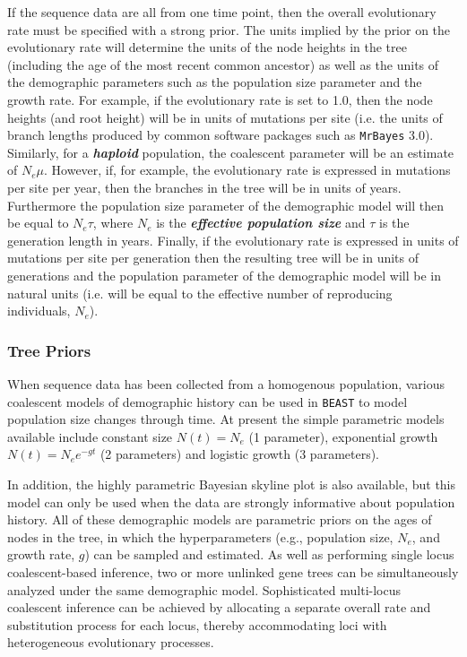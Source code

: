 \documentclass[cup7b, english]{cupbook}
\begin{document}
If the sequence data are all from one time point, then the overall
evolutionary rate must be specified with a strong prior. The units
implied by the prior on the evolutionary rate will determine the units
of the node heights in the tree (including the age of the most recent
common ancestor) as well as the units of the demographic parameters
such as the population size parameter and the growth rate. For example,
if the evolutionary rate is set to 1.0, then the node heights (and
root height) will be in units of mutations per site (i.e. the units
of branch lengths produced by common software packages such as \texttt{MrBayes}
3.0). Similarly, for a \textbf{\textit{haploid}} population, the coalescent parameter
will be an estimate of $N_{e}\mu$. However, if, for example, the
evolutionary rate is expressed in mutations per site per year, then
the branches in the tree will be in units of years. Furthermore the
population size parameter of the demographic model will then be equal
to $N_{e}\tau$, where $N_{e}$ is the \textbf{\textit{effective population size}} and
$\tau$ is the generation length in years. Finally, if the evolutionary
rate is expressed in units of mutations per site per generation then
the resulting tree will be in units of generations and the population
parameter of the demographic model will be in natural units (i.e.
will be equal to the effective number of reproducing individuals,
$N_{e}$).

\subsubsection{Tree Priors}

When sequence data has been collected from a homogenous population,
various coalescent \cite{Kingman1982,GT1994} models of demographic
history can be used in \texttt{BEAST} to model population size changes through
time. At present the simple parametric models available include constant
size $N(t)=N_{e}$ (1 parameter), exponential growth $N(t)=N_{e}e^{-gt}$
(2 parameters) and logistic growth (3 parameters).

In addition, the highly parametric Bayesian skyline plot \cite{DRSP2005}
is also available, but this model can only be used when the data are
strongly informative about population history. All of these demographic
models are parametric priors on the ages of nodes in the tree, in
which the hyperparameters (e.g., population size, $N_{e}$, and growth
rate, $g$) can be sampled and estimated. As well as performing single
locus coalescent-based inference, two or more unlinked gene trees
can be simultaneously analyzed under the same demographic model. Sophisticated
multi-locus coalescent inference can be achieved by allocating a separate
overall rate and substitution process for each locus, thereby accommodating
loci with heterogeneous evolutionary processes.
\end{document}
